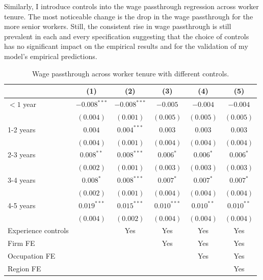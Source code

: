 Similarly, I introduce controls into the wage passthrough regression across worker tenure. The most noticeable change is the drop in the wage passthrough for the more senior workers. Still, the consistent rise in wage passthrough is still prevalent in each and every specification suggesting that the choice of controls has no significant impact on the empirical results and for the validation of my model's empirical predictions. 

\begin{table}[h!]
  \centering
  \begin{tabular}{lccccc}
    \hline
    & (1) & (2) & (3) & (4) & (5)  \\
    \midrule
    \hline
    $<\!1$ year     &  $-0.008^{***}$       &  $-0.008^{***}$  &  $-0.005$        &  $-0.004$       &  $-0.004$       \\  
                    &  $(0.004)$     &  $(0.001)$       &  $(0.005)$       &  $(0.005)$      & $(0.005)$        \\
    
    1-2 years       &  $0.004$       &  $0.004^{***}$   &  $0.003$         &  $0.003$        &  $0.003$       \\  
                    &  $(0.004)$     &  $(0.001)$       &  $(0.004)$       &  $(0.004)$      & $(0.004)$        \\

    2-3 years       &  $0.008^{**}$  &  $0.008^{***}$   &  $0.006^{*}$     &  $0.006^*$      &  $0.006^*$       \\  
                    &  $(0.002)$     &  $(0.001)$       &  $(0.003)$       &  $(0.003)$      & $(0.003)$        \\
    3-4 years       &  $0.008^{*}$   &  $0.008^{***}$   &  $0.007^{*}$     &  $0.007^*$      &  $0.007^*$       \\  
                    &  $(0.002)$     &  $(0.001)$       &  $(0.004)$       &  $(0.004)$      & $(0.004)$        \\
    4-5 years       &  $0.019^{***}$ &  $0.015^{***}$   &  $0.010^{***}$   &  $0.010^{**}$   &  $0.010^{**}$       \\  
                    &  $(0.004)$     &  $(0.002)$       &  $(0.004)$       &  $(0.004)$      & $(0.004)$        \\
    \hline
    \hline
    Experience controls   &                & Yes            & Yes            & Yes            & Yes            \\
    Firm FE               &                &                & Yes            & Yes            & Yes            \\
    Occupation FE         &                &                &                & Yes            & Yes            \\
    Region FE             &                &                &                &                & Yes            \\
    \hline
  \end{tabular}
  \caption{Wage passthrough across worker tenure with different controls.}
  \label{tab:controls_wage_tenure}
\end{table}

